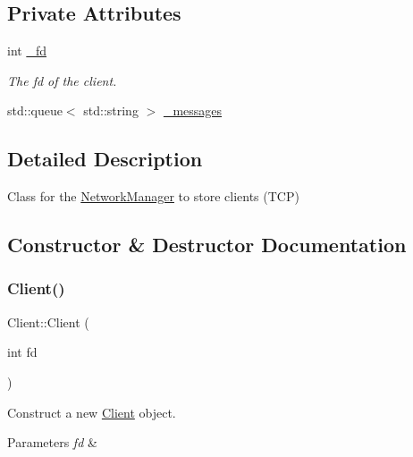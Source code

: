 \subsection*{Private Attributes}
\begin{DoxyCompactItemize}
\item 
int \mbox{\hyperlink{classClient_a76a7d1bb0a940f1b180ac251b47e6cf4}{\+\_\+fd}}
\begin{DoxyCompactList}\small\item\em The fd of the client. \end{DoxyCompactList}\item 
std\+::queue$<$ std\+::string $>$ \mbox{\hyperlink{classClient_a5bbd57271ee0ee9a87a465621d1e669a}{\+\_\+messages}}
\end{DoxyCompactItemize}


\subsection{Detailed Description}
Class for the \mbox{\hyperlink{classNetworkManager}{Network\+Manager}} to store clients (T\+CP) 

\subsection{Constructor \& Destructor Documentation}
\mbox{\label{classClient_af0ffba7d73ea07f7610d6b1a98fbc561}} 
\subsubsection{\texorpdfstring{Client()}{Client()}}
{\footnotesize\ttfamily Client\+::\+Client (\begin{DoxyParamCaption}\item[{int}]{fd }\end{DoxyParamCaption})}



Construct a new \mbox{\hyperlink{classClient}{Client}} object. 


\begin{DoxyParams}{Parameters}
{\em fd} & \\
\hline
\end{DoxyParams}
\mbox{\label{classClient_a840e519ca781888cbd54181572ebe3a7}} 

